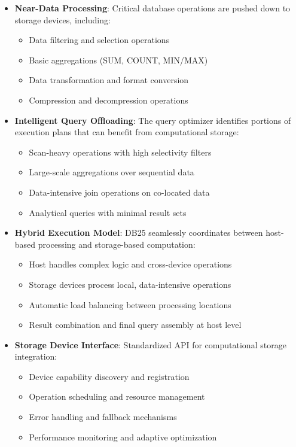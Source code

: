 \documentclass[12pt,a4paper]{article}
\begin{document}
    \begin{itemize}
        \item \textbf{Near-Data Processing}: Critical database operations are pushed down to storage devices, including:
        \begin{itemize}
            \item Data filtering and selection operations
            \item Basic aggregations (SUM, COUNT, MIN/MAX)
            \item Data transformation and format conversion
            \item Compression and decompression operations
        \end{itemize}

        \item \textbf{Intelligent Query Offloading}: The query optimizer identifies portions of execution plans that can benefit from computational storage:
        \begin{itemize}
            \item Scan-heavy operations with high selectivity filters
            \item Large-scale aggregations over sequential data
            \item Data-intensive join operations on co-located data
            \item Analytical queries with minimal result sets
        \end{itemize}

        \item \textbf{Hybrid Execution Model}: DB25 seamlessly coordinates between host-based processing and storage-based computation:
        \begin{itemize}
            \item Host handles complex logic and cross-device operations
            \item Storage devices process local, data-intensive operations
            \item Automatic load balancing between processing locations
            \item Result combination and final query assembly at host level
        \end{itemize}

        \item \textbf{Storage Device Interface}: Standardized API for computational storage integration:
        \begin{itemize}
            \item Device capability discovery and registration
            \item Operation scheduling and resource management
            \item Error handling and fallback mechanisms
            \item Performance monitoring and adaptive optimization
        \end{itemize}
    \end{itemize}
\end{document}
